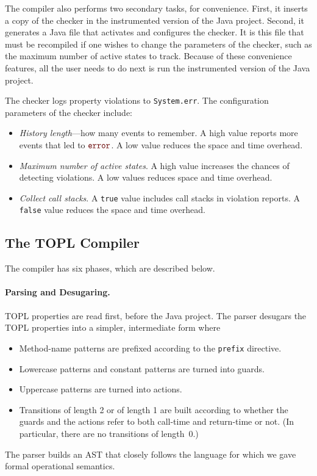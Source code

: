 \documentclass[9pt, preprint]{sigplanconf} %
\newcommand{\error}{\ensuremath{\textcolor{darkred}{\mathtt{error}}}\xspace}
\theoremstyle{definition}
\theoremstyle{remark}
\begin{document}
The compiler also performs two secondary tasks, for convenience.
First, it inserts a copy of the checker in the instrumented version of the Java project.
Second, it generates a Java file that activates and configures the checker.
It is this file that must be recompiled if one wishes to change the parameters of the checker, such as the maximum number of active states to track.
Because of these convenience features, all the user needs to do next is run the instrumented version of the Java project.

The checker logs property violations to {\tt System.err}.
The configuration parameters of the checker include:
\begin{itemize}
\item \emph{History length}---how many events to remember.
  A high value reports more events that led to \error.
  A low value reduces the space and time overhead.
\item \emph{Maximum number of active states}.
  A high value increases the chances of detecting violations.
  A low values reduces space and time overhead.
\item \emph{Collect call stacks}.
  A {\tt true} value includes call stacks in violation reports.
  A {\tt false} value reduces the space and time overhead.
\end{itemize}

\subsection{The TOPL Compiler} \label{sec:toplc} %

The compiler has six phases, which are described below.

\paragraph{Parsing and Desugaring.}
TOPL properties are read first, before the Java project.
The parser desugars the TOPL properties into a simpler, intermediate form where
\begin{itemize}
\item Method-name patterns are prefixed according to the {\tt prefix} directive.
\item Lowercase patterns and constant patterns are turned into guards.
\item Uppercase patterns are turned into actions.
\item Transitions of length 2 or of length 1 are built according to whether the guards and the actions refer to both call-time and return-time or not. (In particular, there are no transitions of length~$0$.)
\end{itemize}
The parser builds an AST that closely follows the language for which we gave formal operational semantics.
\end{document}

